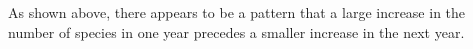 \documentclass[landscape,a1paper,fontscale=0.46]{baposter}
\begin{document}
\begin{poster}
{\begin{multicols}{2}
 As shown above, there appears to be a pattern that a large increase in the number of species in one year precedes a smaller increase in the next year.

 \end{multicols}
 }
 
\end{poster}
\end{document}
